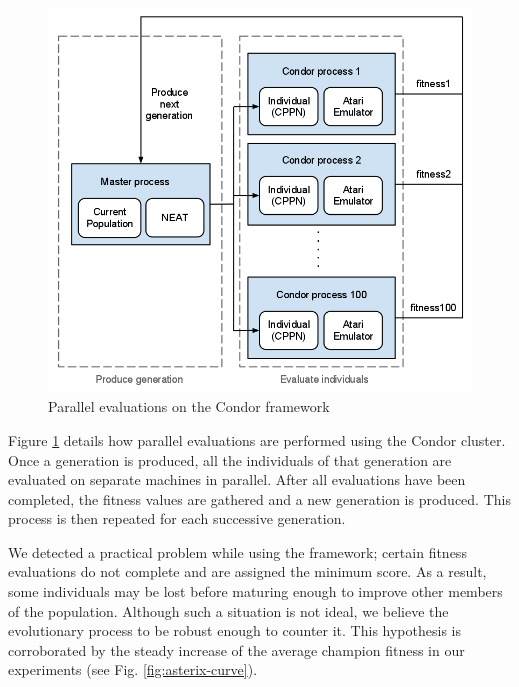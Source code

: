 \documentclass{acm_proc_article-sp}
\begin{document}
\begin{figure}[ht]
\begin{center}
\includegraphics[width=\columnwidth]{figures/condor-hyperneat-small.png}
\end{center}
\caption{Parallel evaluations on the Condor framework}
\label{fig:condor}
\end{figure}

Figure \ref{fig:condor} details how parallel evaluations are performed using the Condor cluster. Once a generation is produced, all the individuals of that generation are evaluated on separate machines in parallel. After all evaluations have been completed, the fitness values are gathered and a new generation is produced. This process is then repeated for each successive generation. 

We detected a practical problem while using the framework; certain fitness evaluations do not complete and are assigned the minimum score. As a result, some individuals may be lost before maturing enough to improve other members of the population. Although such a situation is not ideal, we believe the evolutionary process to be robust enough to counter it. This hypothesis is corroborated by the steady increase of the average champion fitness in our experiments (see Fig. \ref{fig:asterix-curve}). 
\end{document}
